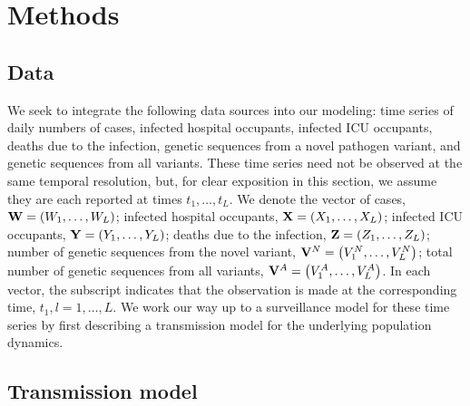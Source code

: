 \section{Methods}
\label{ch_5:sec:methods}

\subsection{Data}
\label{ch_5:subsec:data}

We seek to integrate the following data sources into our modeling: time series of daily numbers of cases, infected hospital occupants, infected ICU occupants, deaths due to the infection, genetic sequences from a novel pathogen variant, and genetic sequences from all variants.
These time series need not be observed at the same temporal resolution, but, for clear exposition in this section, we assume they are each reported at times \( t_1, \ldots, t_L \).
We denote the vector of cases, \( \mathbf{W} = \left( W_1, \ldots, W_L \right) \); infected hospital occupants, \( \mathbf{X} = \left( X_1, \ldots, X_L \right) \); infected ICU occupants, \( \mathbf{Y} = \left( Y_1, \ldots, Y_L \right) \); deaths due to the infection, \( \mathbf{Z} = \left( Z_1, \ldots, Z_L \right) \); number of genetic sequences from the novel variant, \( \mathbf{V}^N =  \left( V^N_1, \ldots, V^N_L \right)\); total number of genetic sequences from all variants, \( \mathbf{V}^A =  \left( V^A_1, \ldots, V^A_L \right)\). In each vector, the subscript indicates that the observation is made at the corresponding time, \( t_1, l = 1, \ldots, L \).
We work our way up to a surveillance model for these time series by first describing a transmission model for the underlying population dynamics.

\subsection{Transmission model}
\label{ch_5:subsec:transmission}

